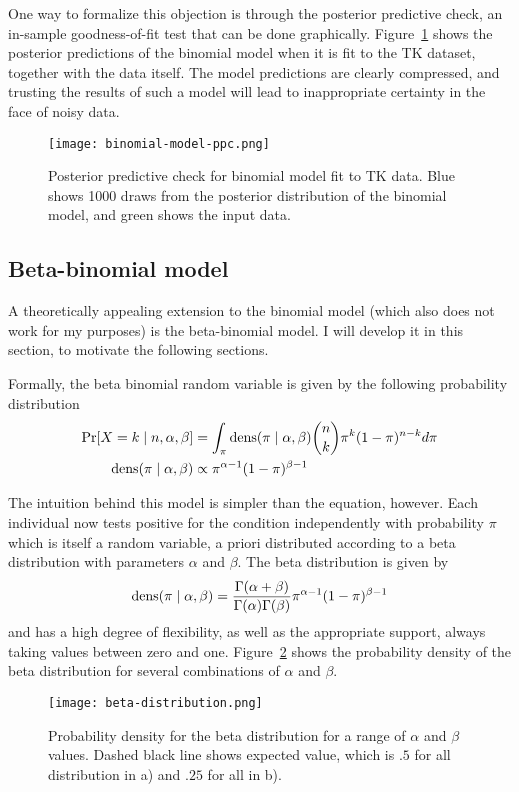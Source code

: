 One way to formalize this objection is through the posterior predictive
check, an in-sample goodness-of-fit test that can be done
graphically.  Figure~\ref{fig:theory-rate_model-binom_ppc} shows the
posterior predictions of the binomial model when it is fit to the TK
dataset, together with the data itself.  The model predictions are
clearly compressed, and trusting the results of such a model will lead
to inappropriate certainty in the face of noisy data.

\begin{figure}[ht]
\begin{center}
\texttt{[image: binomial-model-ppc.png]}
\end{center}
\caption{Posterior predictive check for binomial model fit to TK
  data.  Blue shows 1000 draws from the posterior distribution of the
  binomial model, and green shows the input data.}
\label{fig:theory-rate_model-binom_ppc}
\end{figure}




\subsection{Beta-binomial model}
A theoretically appealing extension to the binomial model (which also
does not work for my purposes) is the beta-binomial model.  I will
develop it in this section, to motivate the following sections.

Formally, the beta binomial random variable is given by the following
probability distribution
\begin{align*}
\operatorname{Pr}[X = k\;|\; n, \alpha, \beta] 
  &= \int_{\pi}\operatorname{dens}(\pi\;|\; \alpha, \beta) \binom{n}{k}\pi^k(1-\pi)^{n-k}
d\pi\\
\operatorname{dens}(\pi\;|\; \alpha, \beta) &\propto \pi^{\alpha-1}(1-\pi)^{\beta-1}
\end{align*}

The intuition behind this model is simpler than the equation, however.
Each individual now tests positive for the condition independently
with probability $\pi$ which is itself a random variable, a priori
distributed according to a beta distribution with parameters $\alpha$
and $\beta$. The beta distribution is given by 
\[
\operatorname{dens}(\pi\;|\; \alpha, \beta) =
\frac{\Gamma(\alpha+\beta)}{\Gamma(\alpha)\Gamma(\beta)}\pi^{\alpha-1}(1-\pi)^{\beta-1}
\]
and has a high degree of flexibility, as well as the appropriate
support, always taking values between zero and one.
Figure~\ref{fig:theory-rate_model-beta} shows the probability density
of the beta distribution for several combinations of $\alpha$ and
$\beta$.
\begin{figure}[ht]
\begin{center}
\texttt{[image: beta-distribution.png]}
\end{center}
\caption{Probability density for the beta distribution for a range of
  $\alpha$ and $\beta$ values. Dashed black line shows expected value,
which is $.5$ for all distribution in a) and $.25$ for all in b).}
\label{fig:theory-rate_model-beta}
\end{figure}

